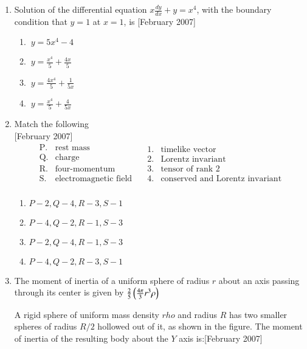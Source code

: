 \documentclass[journal]{IEEEtran}
\begin{document}
\begin{enumerate}
\item Solution of the differential equation $ x \frac{dy}{dx} + y = x^4 $, with the boundary condition that $ y = 1 $ at  $x = 1$, is \hfill[February 2007]
\begin{enumerate}
\item $ \ y = 5x^4 - 4$
\item $\ y = \frac{x^4}{5} + \frac{4x}{5} $
\item $ \ y = \frac{4x^4}{5} + \frac{1}{5x} $
\item $\ y = \frac{x^4}{5} + \frac{4}{5x} $
\end{enumerate} 
\item Match the following \\ \hfill[February 2007] \[
\begin{array}{cl}
\text{P.} & \text{rest mass} \\
\text{Q.} & \text{charge} \\
\text{R.} & \text{four-momentum} \\
\text{S.} & \text{electromagnetic field} \\
\end{array}
\quad
\begin{array}{cl}
1. & \text{timelike vector} \\
2. & \text{Lorentz invariant} \\
3. & \text{tensor of rank 2} \\
4. & \text{conserved and Lorentz invariant} \\
\end{array}
\]
\begin{enumerate}
    \item $P-2,Q-4,R-3,S-1$
    \item $P-4,Q-2,R-1,S-3$
    \item $P-2,Q-4,R-1,S-3$
    \item $P-4,Q-2,R-3,S-1$
    \end{enumerate}

\item The moment of inertia of a uniform sphere of radius  $r$ about an axis passing through its center is given by 
$\frac{2}{5} \left(\frac{4\pi}{3} r^3 \rho \right)$ 

A rigid sphere of uniform mass density $rho$ and radius  $R$ has two smaller spheres of radius $ R/2$  hollowed out of it, as shown in the figure. The moment of inertia of the resulting body about the $Y$ axis is:\hfill[February 2007]
\begin{center}
\end{center}
\end{enumerate}
\end{document}

